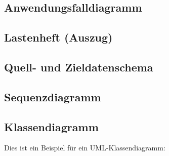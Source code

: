 \documentclass[11pt,toc=sectionentrywithoutdots, 
headheight=44pt, headings=optiontoheadandtoc, hyperfootnotes=false, hypertexnames=false]{scrartcl}
\begin{document}
\subsection{Anwendungsfalldiagramm}
\blindtext\blindtext

\subsection{Lastenheft (Auszug)}
\blindtext\blindtext

\subsection{Quell- und Zieldatenschema}
\blindtext\blindtext

\subsection{Sequenzdiagramm}
\blindtext


\subsection{Klassendiagramm}

Dies ist ein Beispiel für ein UML-Klassendiagramm:\\
\end{document}
